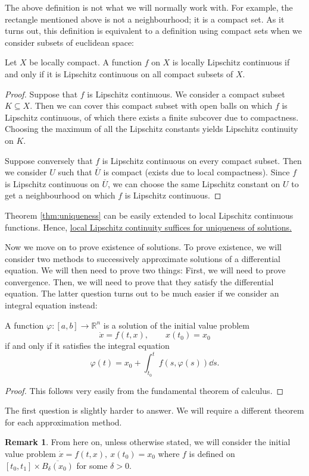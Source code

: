 \documentclass[prb,12pt]{revtex4-2}
\theoremstyle{definition}
\newtheorem{Remark}[Theorem]{Remark}
\theoremstyle{definition}
\theoremstyle{definition}
\newcommand{\R}{\mathbb{R}}
\begin{document}
	The above definition is not what we will normally work with. For example, the rectangle mentioned above is not a neighbourhood; it is a compact set. As it turns out, this definition is equivalent to a definition using compact sets when we consider subsets of euclidean space:
	\begin{Theorem}
		Let $X$ be locally compact. A function $f$ on $X$ is locally Lipschitz continuous if and only if it is Lipschitz continuous on all compact subsets of $X$.
	\end{Theorem}
	\begin{proof}
		Suppose that $f$ is Lipschitz continuous. We consider a compact subset $K\subseteq X$. Then we can cover this compact subset with open balls on which $f$ is Lipschitz continuous, of which there exists a finite subcover due to compactness. Choosing the maximum of all the Lipschitz constants yields Lipschitz continuity on $K$.
		
		Suppose conversely that $f$ is Lipschitz continuous on every compact subset. Then we consider $U$ such that $\overline{U}$ is compact (exists due to local compactness). Since $f$ is Lipschitz continuous on $\overline{U}$, we can choose the same Lipschitz constant on $U$ to get a neighbourhood on which $f$ is Lipschitz continuous.
	\end{proof}
	Theorem \ref{thm:uniqueness} can be easily extended to local Lipschitz continuous functions. Hence, \uline{local Lipschitz continuity suffices for uniqueness of solutions.}
	
	Now we move on to prove existence of solutions. To prove existence, we will consider two methods to successively approximate solutions of a differential equation. We will then need to prove two things: First, we will need to prove convergence. Then, we will need to prove that they satisfy the differential equation. The latter question turns out to be much easier if we consider an integral equation instead:
	\begin{Theorem}
		A function $\varphi:[a,b]\to \R^n$ is a solution of the initial value problem
		\[\dot{x}=f(t, x),\qquad x(t_0)=x_0\]
		if and only if it satisfies the integral equation
		\[\varphi(t)=x_0 + \int_{t_0}^t f(s, \varphi(s))\dd{s}.\]
	\end{Theorem}
	\begin{proof}
		This follows very easily from the fundamental theorem of calculus.
	\end{proof}
	The first question is slightly harder to answer. We will require a different theorem for each approximation method.
	\begin{Remark}\label{remark:diffeqdefinition}
		From here on, unless otherwise stated, we will consider the initial value problem $\dot{x}=f(t, x),~x(t_0)=x_0$ where $f$ is defined on $[t_0, t_1]\times \overline{B_\delta(x_0)}$ for some $\delta>0$.
	\end{Remark}
\end{document}
